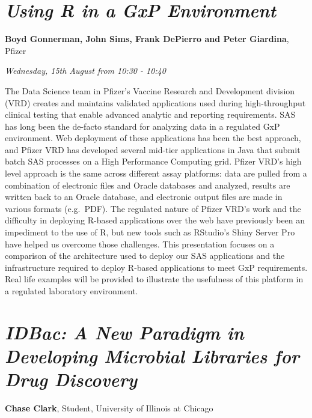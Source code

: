 \documentclass[]{book}
\theoremstyle{definition}
\theoremstyle{definition}
\theoremstyle{definition}
\theoremstyle{remark}
\begin{document}
\hypertarget{using-r-in-a-gxp-environment-1}{%
\section{\texorpdfstring{\emph{Using R in a GxP
Environment}}{Using R in a GxP Environment}}\label{using-r-in-a-gxp-environment-1}}

\textbf{Boyd Gonnerman, John Sims, Frank DePierro and Peter Giardina},
Pfizer

\emph{Wednesday, 15th August from 10:30 - 10:40}

The Data Science team in Pfizer's Vaccine Research and Development
division (VRD) creates and maintains validated applications used during
high-throughput clinical testing that enable advanced analytic and
reporting requirements. SAS has long been the de-facto standard for
analyzing data in a regulated GxP environment. Web deployment of these
applications has been the best approach, and Pfizer VRD has developed
several mid-tier applications in Java that submit batch SAS processes on
a High Performance Computing grid. Pfizer VRD's high level approach is
the same across different assay platforms: data are pulled from a
combination of electronic files and Oracle databases and analyzed,
results are written back to an Oracle database, and electronic output
files are made in various formats (e.g.~PDF). The regulated nature of
Pfizer VRD's work and the difficulty in deploying R-based applications
over the web have previously been an impediment to the use of R, but new
tools such as RStudio's Shiny Server Pro have helped us overcome those
challenges. This presentation focuses on a comparison of the
architecture used to deploy our SAS applications and the infrastructure
required to deploy R-based applications to meet GxP requirements. Real
life examples will be provided to illustrate the usefulness of this
platform in a regulated laboratory environment.

\hypertarget{idbac-a-new-paradigm-in-developing-microbial-libraries-for-drug-discovery-1}{%
\section{\texorpdfstring{\emph{IDBac: A New Paradigm in Developing
Microbial Libraries for Drug
Discovery}}{IDBac: A New Paradigm in Developing Microbial Libraries for Drug Discovery}}\label{idbac-a-new-paradigm-in-developing-microbial-libraries-for-drug-discovery-1}}

\textbf{Chase Clark}, Student, University of Illinois at Chicago
\end{document}
